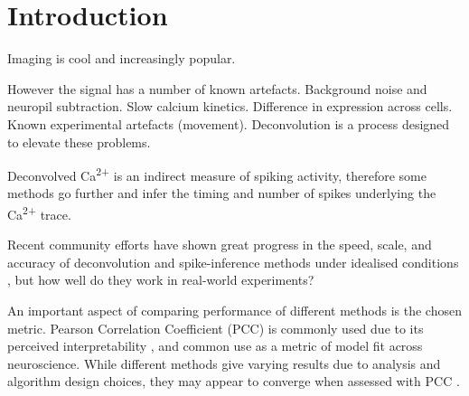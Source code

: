 \documentclass[a4paper,10pt,twocolumn]{article}
\begin{document}
\section{Introduction}
Imaging is cool and increasingly popular. 


However the signal has a number of known artefacts. Background noise and neuropil subtraction. Slow calcium kinetics. Difference in expression across cells. Known experimental artefacts (movement). Deconvolution is a process designed to elevate these problems. 

Deconvolved Ca\textsuperscript{2+} is an indirect measure of spiking activity, therefore some methods go further and infer the timing and number of spikes underlying the Ca\textsuperscript{2+} trace.


Recent community efforts have shown great progress in the speed, scale, and accuracy of deconvolution and spike-inference methods under idealised conditions \citep{Berens2018-su}, but how well do they work in real-world experiments?

An important aspect of comparing performance of different methods is the chosen metric. Pearson Correlation Coefficient (PCC) is commonly used due to its perceived interpretability \citep{Theis2016-ee}, and common use as a metric of model fit across neuroscience. While different methods give varying results due to analysis and algorithm design choices, they may appear to converge when assessed with PCC \citep{Berens2018-su}. 
\end{document}
